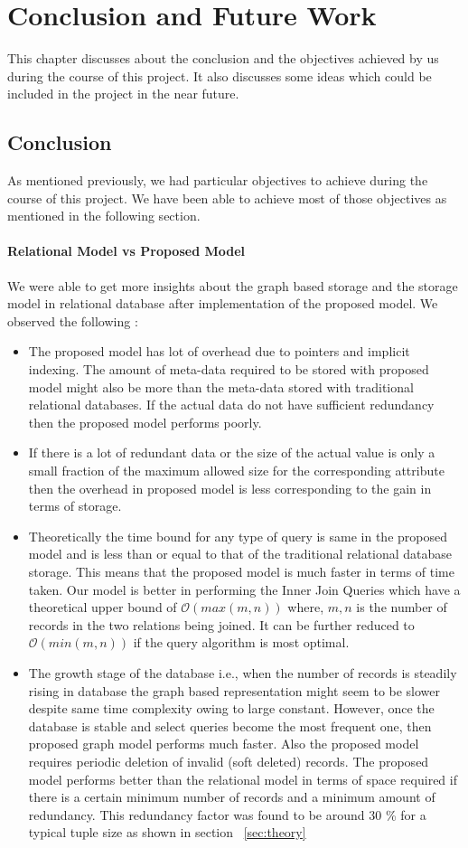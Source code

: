 \documentclass[12pt, oneside]{book}
\begin{document}
\chapter{Conclusion and Future Work}
This chapter discusses about the conclusion and the objectives achieved by us during the course of this project. It also discusses some ideas which could be included in the project in the near future.   
\section{Conclusion}
As mentioned previously, we had particular objectives to achieve during the course of this project. We have been able to achieve most of those objectives as mentioned in the following section.
\subsubsection{Relational Model vs Proposed Model}
We were able to get more insights about the graph based storage and the storage model in relational database after implementation of the proposed model. We observed the following :
\begin{itemize}
 \item The proposed model has lot of overhead due to pointers and implicit indexing. The amount of meta-data required to be stored with proposed model might also be more than the meta-data stored with traditional relational databases. If the actual data do not have sufficient redundancy then the proposed model performs poorly.
 \item If there is a lot of redundant data or the size of the actual value is only a small fraction of the maximum allowed size for the corresponding attribute then the overhead in proposed model is less corresponding to the gain in terms of storage.
 \item Theoretically the time bound for any type of query is same in the proposed model and is less than or equal to that of the traditional relational database storage. This means that the proposed model is much faster in terms of time taken. Our model is better in performing the Inner Join Queries which have a theoretical upper bound of $\mathcal{O}(max(m, n))$ where, $m, n$ is the number of records in the two relations being joined. It can be further reduced to $\mathcal{O}(min(m,n))$ if the query algorithm is most optimal.
 \item The growth stage of the database i.e., when the number of records is steadily rising in database the graph based representation might seem to be slower despite same time complexity owing to large constant. However, once the database is stable and select queries become the most frequent one, then proposed graph model performs much faster. Also the proposed model requires periodic deletion of invalid (soft deleted) records. The proposed model performs better than the relational model in terms of space required if there is a certain minimum number of records and a minimum amount of redundancy. This redundancy factor was found to be around 30 \% for a typical tuple size as shown in section ~\ref{sec:theory}
\end{itemize}
\end{document}

